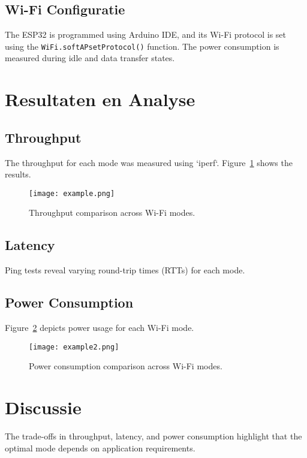 \documentclass[conference]{IEEEtran}
\begin{document}
\subsection{Wi-Fi Configuratie}
The ESP32 is programmed using Arduino IDE, and its Wi-Fi protocol is set using the \texttt{WiFi.softAPsetProtocol()} function. The power consumption is measured during idle and data transfer states. \lipsum[6]

\section{Resultaten en Analyse}
\subsection{Throughput}
The throughput for each mode was measured using `iperf`. Figure~\ref{fig:throughput} shows the results. \lipsum[7]

\begin{figure}[htbp]
    \centering
    \texttt{[image: example.png]} %
    \caption{Throughput comparison across Wi-Fi modes.}
    \label{fig:throughput}
\end{figure}

\subsection{Latency}
Ping tests reveal varying round-trip times (RTTs) for each mode. \lipsum[8]

\subsection{Power Consumption}
Figure~\ref{fig:power} depicts power usage for each Wi-Fi mode. \lipsum[9]

\begin{figure}[htbp]
    \centering
    \texttt{[image: example2.png]} %
    \caption{Power consumption comparison across Wi-Fi modes.}
    \label{fig:power}
\end{figure}

\section{Discussie}
The trade-offs in throughput, latency, and power consumption highlight that the optimal mode depends on application requirements. \lipsum[10-12]
\end{document}
